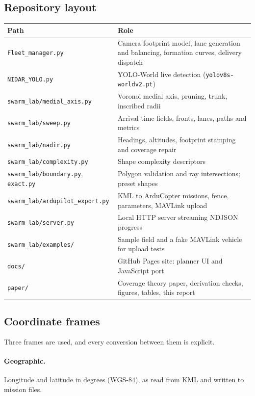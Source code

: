 \documentclass[11pt,a4paper]{article}
\newcommand{\code}[1]{\texttt{#1}}
\begin{document}
\subsection{Repository layout}

\begin{center}
\begin{tabularx}{\linewidth}{@{}lX@{}}
\toprule
Path & Role \\
\midrule
\code{Fleet\_manager.py} & Camera footprint model, lane generation and balancing, formation curves, delivery dispatch \\
\code{NIDAR\_YOLO.py} & YOLO-World live detection (\code{yolov8s-worldv2.pt}) \\
\code{swarm\_lab/medial\_axis.py} & Voronoi medial axis, pruning, trunk, inscribed radii \\
\code{swarm\_lab/sweep.py} & Arrival-time fields, fronts, lanes, paths and metrics \\
\code{swarm\_lab/nadir.py} & Headings, altitudes, footprint stamping and coverage repair \\
\code{swarm\_lab/complexity.py} & Shape complexity descriptors \\
\code{swarm\_lab/boundary.py}, \code{exact.py} & Polygon validation and ray intersections; preset shapes \\
\code{swarm\_lab/ardupilot\_export.py} & KML to ArduCopter missions, fence, parameters, MAVLink upload \\
\code{swarm\_lab/server.py} & Local HTTP server streaming NDJSON progress \\
\code{swarm\_lab/examples/} & Sample field and a fake MAVLink vehicle for upload tests \\
\code{docs/} & GitHub Pages site: planner UI and JavaScript port \\
\code{paper/} & Coverage theory paper, derivation checks, figures, tables, this report \\
\bottomrule
\end{tabularx}
\end{center}

\subsection{Coordinate frames}

Three frames are used, and every conversion between them is explicit.

\paragraph{Geographic.} Longitude and latitude in degrees (WGS-84), as read from KML and written to
mission files.
\end{document}
